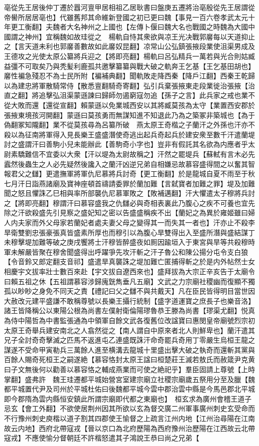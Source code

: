 亳從先王居後仲丁遷於囂河亶甲居相祖乙居耿書曰盤庚五遷將治亳殷從先王居謂從帝嚳所居居亳也】代雖舊邦其命維新登國之初已更曰魏【事見一百六卷孝武太元十年更工衡翻】夫魏者大名神州之上國也【左傳卜偃曰魏大名也戰國之時魏為大國中國謂之神州】宜稱魏如故珪從之　楊軌自恃其衆欲與凉王光决戰郭黁每以天道抑止之【言天道未利也郭黁善數故如此黁奴昆翻】凉常山公弘鎮張掖段業使沮渠男成及王德攻之光使太原公纂將兵迎之【將即亮翻】楊軌曰呂弘精兵一萬若與光合則姑臧益彊不可取矣乃與秃髪利鹿孤共邀擊纂纂與戰大破之軌奔王乞基【王乞基田胡也】黁性褊急殘忍不為士民所附【褊補典翻】聞軌敗走降西秦【降戶江翻】西秦王乾歸以為建忠將軍散騎常侍【散悉亶翻騎奇寄翻】弘引兵棄張掖東走段業徙治張掖【治直之翻】將追擊弘沮渠蒙遜諫曰歸師勿遏窮寇勿追【孫子之言】此兵家之戒也業不從大敗而還【還從宣翻】賴蒙遜以免業城西安以其將臧莫孩為太守【業置西安郡於張掖東境孩河開翻】蒙遜曰莫孩勇而無謀知進不知退此乃為之築冢非築城也【為于偽翻冢知隴翻】業不從莫孩尋為呂纂所破　燕太原王奇楷之子蘭汗之外孫也汗亦不殺以為征南將軍得入見長樂王盛盛潛使奇逃出起兵奇起兵於建安衆至數千汗遣蘭堤討之盛謂汗曰善駒小兒未能辦此【善駒奇小字也】豈非有假託其名欲為内應者乎太尉素驕難信不宜委以大衆【汗以堤為太尉故稱之】汗然之罷堤兵【蘇軾有言木必先蠧然後蟲生之人必先疑然後讒入之蘭汗凶逆兄弟自相嫌忌故慕容盛得間之以奮其智報君父之讎】更遣撫軍將軍仇尼慕將兵討奇【更工衡翻】於是龍城自夏不雨至于秋七月汗日詣燕諸廟及寶神座頓首禱請委罪於蘭加難【言弑寶者加難之罪】堤及加難聞之怒且懼誅乙巳相與率所部襲仇尼慕軍敗之【敗補邁翻】汗大懼遣太子穆將兵討之【將即亮翻】穆謂汗曰慕容盛我之仇讎必與奇相表裏此乃腹心之疾不可養也宜先除之汗欲殺盛先引見察之盛妃知之密以告盛盛稱疾不出【蘭妃之為異於雍姬雖曰婦人内夫家而外父母家若蘭妃者處夫妻父母之變得其一而失其一者也】汗亦止不殺李旱衛雙劉忠張豪張真皆盛素所厚也而穆引以為腹心旱雙得出入至盛所潛與盛結謀丁未穆擊堤加難等破之庚戌饗將士汗穆皆醉盛夜如厠因踰垣入于東宮與旱等共殺穆時軍未解嚴皆聚在穆舍聞盛得出呼躍爭先攻汗斬之汗子魯公和陳公揚分屯令支白狼【令音鈴又郎定翻支音祁】盛遣旱真襲誅之堤加難亡匿捕得斬之於是内外帖然士女相慶宇文拔率壯士數百來赴【宇文拔自遼西來也】盛拜拔為大宗正辛亥告于太廟令曰賴五祖之休【五祖謂慕容涉歸廆皝雋垂凡五廟】文武之力宗廟社稷幽而復顯不獨孤以眇眇之身免不同天之責【禮記曰父之讎不與共戴天】凡在臣民皆得明目當世因大赦改元建平盛謙不敢稱尊號以長樂王攝行統制【盛字道運寶之庶長子也樂音洛】諸王皆降稱公以東陽公根為尚書左僕射衛倫陽璆魯恭王滕為尚書【璆渠尤翻】悦真為侍中陽哲為中書監張通為中領軍自餘文武各復舊位改諡寶曰惠閔皇帝廟號烈宗初太原王奇舉兵建安南北之人翕然從之【南人謂自中原來者北人則鮮卑也】蘭汗遣其兄子全討奇奇擊滅之匹馬不返進屯乙連盛既誅汗命奇罷兵奇用丁零嚴生烏桓王龍之謀遂不受命甲寅勒兵三萬餘人進至横溝去龍城十里盛出擊大破之執奇而還斬其黨與百餘人賜奇死桓王之嗣遂絶【慕容恪封太原王諡曰桓楚莊王滅若敖氏而赦箴尹克黄曰子文無後何以勸善以慕容恪之輔成燕業而可使之絶祀乎】羣臣固請上尊號【上時掌翻】盛弗許　魏王珪遷都平城始營宮室建宗廟立社稷宗廟歲五祭用分至及臘【魏都平城置代尹及司州於平城杜佑曰後魏都平城今雲中郡治雲中縣是今馬邑郡北平城即今郡隋為雲内縣恒安鎮此所謂宗廟即代都之東廟也】　桓玄求為廣州會稽王道子忌玄【會工外翻】不欲使居荆州因其所欲以玄為督交廣二州軍事廣州刺史玄受命而不行豫州刺史庾楷以道子割其四郡使王愉督之上疏言江州内地【江州治尋陽在江南故云内地】西府北帶寇戎【晉以京口為北府歷陽為西府豫州治歷陽在江西故云北帶寇戎】不應使愉分督朝廷不許楷怒遣其子鴻說王恭曰尚之兄弟【
